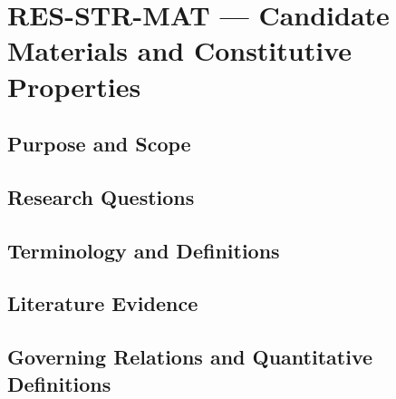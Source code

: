 
\section{RES-STR-MAT --- Candidate Materials and Constitutive Properties}
\label{sec:res-str-mat}

\subsection{Purpose and Scope}
\label{sec:res-str-mat-purpose}


\subsection{Research Questions}
\label{sec:res-str-mat-research-questions}


\subsection{Terminology and Definitions}
\label{sec:res-str-mat-definitions}


\subsection{Literature Evidence}
\label{sec:res-str-mat-literature-evidence}

%

\subsection{Governing Relations and Quantitative Definitions}
\label{sec:res-str-mat-governing-relations}

